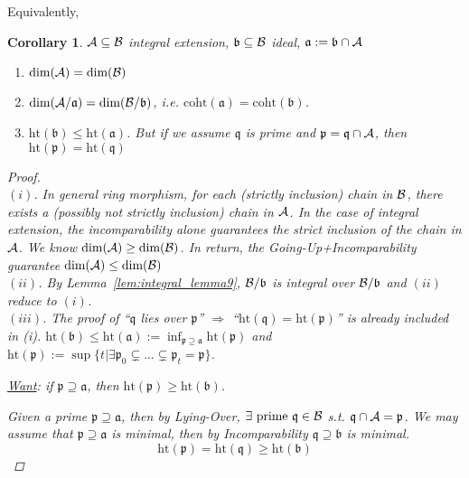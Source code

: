 \documentclass[11pt]{article}
\newtheorem{cor}[thm]{Corollary}
\newcommand{\sca}{{\mathfrak a}}
\newcommand{\scb}{{\mathfrak b}}
\newcommand{\scp}{{\mathfrak p}}
\newcommand{\scq}{\mathfrak q}
\newcommand{\cala}{{\cal A}}
\newcommand{\calb}{{\cal B}}
\newcommand{\Lrta}{\Longrightarrow}
\begin{document}
Equivalently,

\begin{cor}
$\cala\subseteq\calb$ integral extension, $\scb\subseteq\calb$ ideal, $\sca:=\scb\cap\cala$
\begin{enumerate}[label=(\roman*)]
\item $\text{dim}(\cala)=\text{dim}(\calb)$
\item $\text{dim}(\cala/\sca)= \text{dim}(\calb/\scb)$, i.e. $\text{coht}(\sca)=\text{coht}(\scb)$.
\item $\text{ht}(\scb)\leq \text{ht}(\sca)${\color{red}. But if we assume $\scq$ is prime and $\scp=\scq\cap\cala$, then $\text{ht}(\scp)=\text{ht}(\scq)$}
\end{enumerate}
\begin{proof}\ \\
$(i)$\checkmark. In general ring morphism, for each (strictly inclusion) chain in $\calb$, there exists a (possibly not strictly inclusion) chain  in $\cala$. In the case of integral extension, the incomparability alone guarantees the strict inclusion of the chain in $\cala$. We know $\text{dim}(\cala)\geq \text{dim}(\calb)$. In return, the Going-Up+Incomparability guarantee $\text{dim}(\cala)\leq\text{dim}(\calb) $ \\ 
$(ii)$\checkmark. By Lemma~\ref{lem:integral_lemma9}, $\calb/\scb$ is integral over $\calb/\scb$ and $(ii)$ reduce to $(i)$.\\
$(iii)$. {\color{red}The proof of ``$\scq$ lies over $\scp$'' $\Lrta$ ``$\text{ht}(\scq)=\text{ht}(\scp)$'' is already included in (i).} $\text{ht}(\scb)\leq \text{ht}(\sca):=\inf_{\scp\supseteq \sca} \text{ht}(\scp)$ and $\text{ht}(\scp):=\sup\{t|\exists \scp_0\subsetneq...\subsetneq\scp_t=\scp\}$. 

\underline{Want}: if $\scp\supseteq \sca$, then $\text{ht}(\scp)\geq \text{ht}(\scb)$.

Given a prime $\scp\supseteq\sca$, then by Lying-Over,  $\exists\text{ prime } \scq\in\calb$ s.t. $\scq\cap\cala=\scp$. We may assume that $\scp\supseteq\sca$ is minimal, then by Incomparability $\scq\supseteq\scb$ is minimal.
$$
\text{ht}(\scp)=\text{ht}(\scq)\geq \text{ht}(\scb)
$$ 
\end{proof}
\end{cor}
\end{document}
